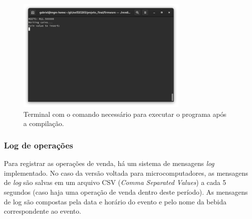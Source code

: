 \begin{figure}[!ht]
    \begin{center}
        \includegraphics[width=0.75\textwidth]{figures/drink-menu.png}
        \caption{Terminal com o comando necessário para executar o programa após a compilação.}
        \label{fig:drink-menu}
    \end{center}
\end{figure}

\subsubsection{Log de operações}

Para registrar as operações de venda, há um sistema de mensagens \textit{log} implementado. No caso da versão voltada para microcomputadores, as mensagens de \textit{log} são salvas em um arquivo CSV (\textit{Comma Separated Values}) a cada 5 segundos (caso haja uma operação de venda dentro deste período). As mensagens de log são compostas pela data e horário do evento e pelo nome da bebida correspondente ao evento.
